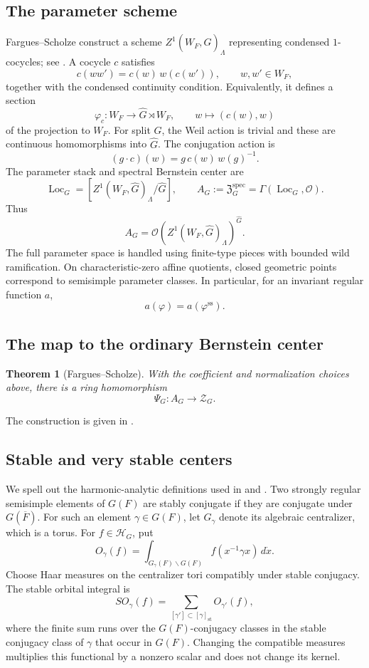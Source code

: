 \documentclass[11pt,a4paper]{amsart}
\newcommand{\OO}{\mathcal O}
\newcommand{\mcH}{\mathcal H}
\newcommand{\mcZ}{\mathcal Z}
\newcommand{\Zspec}{\mathfrak Z^{\mathrm{spec}}}
\newtheorem{theorem}{Theorem}[section]
\theoremstyle{definition}
\theoremstyle{remark}
\begin{document}
\subsection{The parameter scheme}
Fargues--Scholze construct a scheme $Z^1(W_F,\widehat G)_\Lambda$ representing condensed $1$-cocycles; see \cite[Definition VIII.1.1 and Theorem VIII.1.3]{FS}. A cocycle $c$ satisfies
$$
c(ww')=c(w)\,w(c(w')),\qquad w,w'\in W_F,
$$
together with the condensed continuity condition. Equivalently, it defines a section
$$
\varphi_c:W_F\longrightarrow\widehat G\rtimes W_F,\qquad w\longmapsto(c(w),w)
$$
of the projection to $W_F$. For split $G$, the Weil action is trivial and these are continuous homomorphisms into $\widehat G$.
The conjugation action is
$$
(g\cdot c)(w)=g\,c(w)\,w(g)^{-1}.
$$
The parameter stack and spectral Bernstein center are
$$
\operatorname{Loc}_G=[Z^1(W_F,\widehat G)_\Lambda/\widehat G],
\qquad
A_G:=\Zspec_G=\Gamma(\operatorname{Loc}_G,\OO).
$$
Thus
$$
A_G=\OO(Z^1(W_F,\widehat G)_\Lambda)^{\widehat G}.
$$
The full parameter space is handled using finite-type pieces with bounded wild ramification. On characteristic-zero affine quotients, closed geometric points correspond to semisimple parameter classes. In particular, for an invariant regular function $a$,
$$
a(\varphi)=a(\varphi^{\mathrm{ss}}).
$$
\subsection{The map to the ordinary Bernstein center}
\begin{theorem}[Fargues--Scholze]
With the coefficient and normalization choices above, there is a ring homomorphism
$$
\Psi_G:A_G\longrightarrow\mcZ_G.
$$
\end{theorem}
The construction is given in \cite[Proposition I.9.3, Theorem IX.5.2, and Definition IX.7.1]{FS}.
\subsection{Stable and very stable centers}\label{sec:stable-centers}
We spell out the harmonic-analytic definitions used in
\cite[Section 1.1]{H} and \cite[Definition 1.1.1]{Varma}.
Two strongly regular semisimple elements of $G(F)$ are stably
conjugate if they are conjugate under $G(\overline F)$.
For such an element $\gamma\in G(F)$, let $G_\gamma$ denote its
algebraic centralizer, which is a torus. For $f\in\mcH_G$, put
$$
 O_\gamma(f)=\int_{G_\gamma(F)\backslash G(F)}
                f(x^{-1}\gamma x)\,d\dot x.
$$
Choose Haar measures on the centralizer tori compatibly under stable
conjugacy. The stable orbital integral is
$$
 SO_\gamma(f)=\sum_{[\gamma']\subset[\gamma]_{\mathrm{st}}}
                         O_{\gamma'}(f),
$$
where the finite sum runs over the $G(F)$-conjugacy classes in the
stable conjugacy class of $\gamma$ that occur in $G(F)$.
Changing the compatible measures multiplies this functional by a
nonzero scalar and does not change its kernel.
\end{document}
